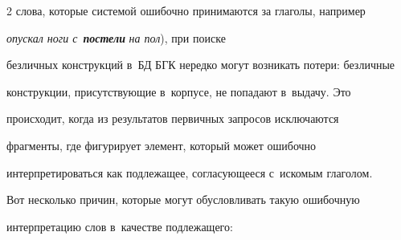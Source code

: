 \begin{multicols}{2}
слова, которые системой ошибочно принимаются за глаголы, например 

\textit{опускал ноги с}~{\bfseries\textit{постели}} \textit{на пол}), при поиске 

безличных конструкций в~БД БГК нередко могут возникать потери: безличные 

конструкции, присутствующие в~корпусе, не попадают в~выдачу. Это 

происходит, когда из результатов первичных запросов исключаются 

фрагменты, где фигурирует элемент, который может ошибочно 

интерпретироваться как подлежащее, согласующееся с~искомым глаголом.

  

  Вот несколько причин, которые могут обуслов\-ли\-вать такую ошибочную 

интерпретацию слов в~качестве подлежащего:

\end{multicols}
